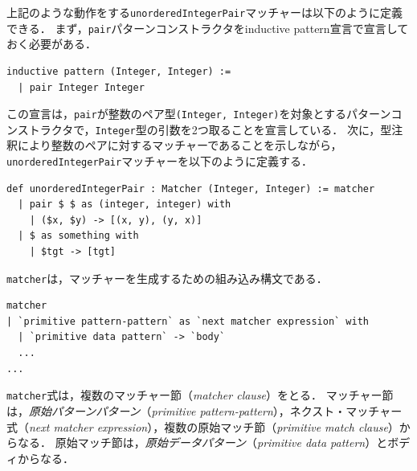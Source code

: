 上記のような動作をする\lstinline{unorderedIntegerPair}マッチャーは以下のように定義できる．
まず，\lstinline{pair}パターンコンストラクタをinductive pattern宣言で宣言しておく必要がある．
\begin{lstlisting}[language=egison]
inductive pattern (Integer, Integer) :=
  | pair Integer Integer
\end{lstlisting}
この宣言は，\lstinline{pair}が整数のペア型\lstinline{(Integer, Integer)}を対象とするパターンコンストラクタで，\lstinline{Integer}型の引数を2つ取ることを宣言している．
次に，型注釈により整数のペアに対するマッチャーであることを示しながら，\lstinline{unorderedIntegerPair}マッチャーを以下のように定義する．
\begin{lstlisting}[language=egison]
def unorderedIntegerPair : Matcher (Integer, Integer) := matcher
  | pair $ $ as (integer, integer) with
    | ($x, $y) -> [(x, y), (y, x)]
  | $ as something with
    | $tgt -> [tgt]
\end{lstlisting}
\lstinline{matcher}は，マッチャーを生成するための組み込み構文である．
\begin{lstlisting}[language=egison,numbers=none]
matcher
| `primitive pattern-pattern` as `next matcher expression` with
  | `primitive data pattern` -> `body`
  ...
...
\end{lstlisting}
\lstinline{matcher}式は，複数のマッチャー節（\emph{matcher clause}）をとる．
マッチャー節は，\emph{原始パターンパターン}（\emph{primitive pattern-pattern}），ネクスト・マッチャー式（\emph{next matcher expression}），複数の原始マッチ節（\emph{primitive match clause}）からなる．
原始マッチ節は，\emph{原始データパターン}（\emph{primitive data pattern}）とボディからなる．

